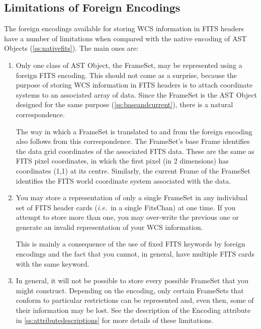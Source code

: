 \documentclass[twoside,11pt]{article}
\newcommand{\appref}[1]{Appendix~\ref{#1}}
\newcommand{\secref}[1]{\S\ref{#1}}
\renewcommand{\appref}[1]{\ref{#1}}
\renewcommand{\secref}[1]{\ref{#1}}
\begin{document}
\subsection{\label{ss:foreignfitslimitations}Limitations of Foreign Encodings}

The foreign encodings available for storing WCS information in FITS
headers have a number of limitations when compared with the native
encoding of AST Objects (\secref{ss:nativefits}). The main ones are:

\begin{enumerate}
\item Only one class of AST Object, the FrameSet, may be represented
using a foreign FITS encoding. This should not come as a surprise,
because the purpose of storing WCS information in FITS headers is to
attach coordinate systems to an associated array of data. Since the
FrameSet is the AST Object designed for the same purpose
(\secref{ss:baseandcurrent}), there is a natural correspondence.

The way in which a FrameSet is translated to and from the foreign
encoding also follows from this correspondence. The FrameSet's base
Frame identifies the data grid coordinates of the associated FITS
data. These are the same as FITS pixel coordinates, in which the first
pixel (in 2 dimensions) has coordinates (1,1) at its
centre. Similarly, the current Frame of the FrameSet identifies the
FITS world coordinate system associated with the data.

\item You may store a representation of only a single FrameSet in any
individual set of FITS header cards ({\em{i.e.}}\ in a single
FitsChan) at one time. If you attempt to store more than one, you may
over-write the previous one or generate an invalid representation of
your WCS information.

This is mainly a consequence of the use of fixed FITS keywords by
foreign encodings and the fact that you cannot, in general, have
multiple FITS cards with the same keyword.

\item In general, it will not be possible to store every possible
FrameSet that you might construct. Depending on the encoding, only
certain FrameSets that conform to particular restrictions can be
represented and, even then, some of their information may be lost. See
the description of the Encoding attribute in
\appref{ss:attributedescriptions} for more details of these
limitations.
\end{enumerate}
\end{document}
